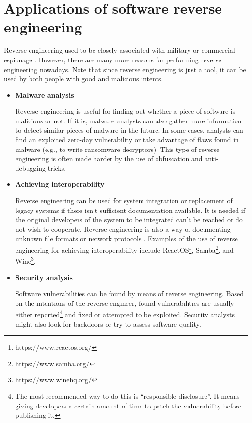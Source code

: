 \documentclass[thesis=B,english]{FITthesis}[2012/10/20]
\begin{document}
	\section{Applications of software reverse engineering}
	
	Reverse engineering used to be closely associated with military or commercial espionage \cite{reveng_origin}. However, there are many more reasons for performing reverse engineering nowadays. Note that since reverse engineering is just a tool, it can be used by both people with good and malicious intents.
	
	\begin{itemize}
		\item \textbf{Malware analysis}
		
		Reverse engineering is useful for finding out whether a piece of software is malicious or not. If it is, malware analysts can also gather more information to detect similar pieces of malware in the future. In some cases, analysts can find an exploited zero-day vulnerability or take advantage of flaws found in malware (e.g., to write ransomware decryptors). This type of reverse engineering is often made harder by the use of obfuscation and anti-debugging tricks.
		
		\item \textbf{Achieving interoperability}
		
		Reverse engineering can be used for system integration or replacement of legacy systems if there isn't sufficient documentation available. It is needed if the original developers of the system to be integrated can't be reached or do not wish to cooperate. Reverse engineering is also a way of documenting unknown file formats or network protocols \cite{reveng}. Examples of the use of reverse engineering for achieving interoperability include ReactOS\footnote{https://www.reactos.org/}, Samba\footnote{https://www.samba.org/}, and Wine\footnote{https://www.winehq.org/}.
		
		\item \textbf{Security analysis}
		
		Software vulnerabilities can be found by means of reverse engineering. Based on the intentions of the reverse engineer, found vulnerabilities are usually either reported\footnote{The most recommended way to do this is ``responsible disclosure''. It means giving developers a certain amount of time to patch the vulnerability before publishing it.} and fixed or attempted to be exploited. Security analysts might also look for backdoors or try to assess software quality.
		

\end{itemize}
\end{document}
